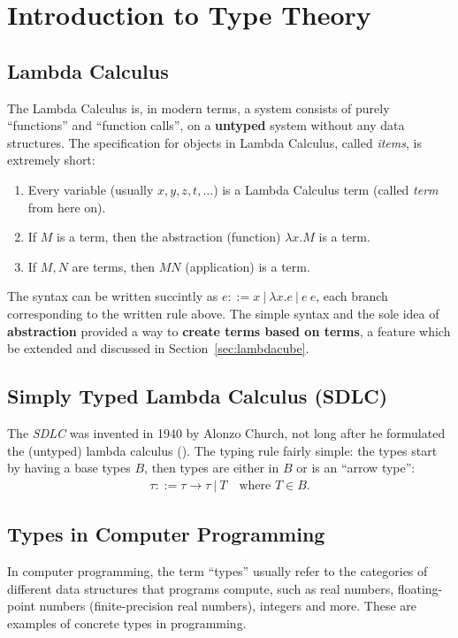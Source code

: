 \documentclass[acmsmall]{acmart}
\begin{document}
\section{Introduction to Type Theory}\label{sec:tt}

\subsection{Lambda Calculus}
The Lambda Calculus is, in modern terms, a system consists of purely
``functions'' and ``function calls'', on a \textbf{untyped} system without any data
structures. The specification for objects in Lambda Calculus, called
\emph{items}, is extremely short:
\begin{enumerate}
  \item Every variable (usually $x, y, z, t, \ldots$) is a Lambda Calculus term
        (called \emph{term} from here on).
  \item If $M$ is a term, then the abstraction (function) $\lambda x. M$ is a term.
  \item If $M, N$ are terms, then $M N$ (application) is a term.
\end{enumerate}

The syntax can be written succintly as $e ::= x\ |\ \lambda x.e\ |\ e\ e$, each branch
corresponding to the written rule above. The simple syntax and the sole idea of
\textbf{abstraction} provided a way to \textbf{create terms based on terms}, a
feature which be extended and discussed in Section~\ref{sec:lambdacube}.

\subsection{Simply Typed Lambda Calculus (SDLC)}
The \emph{SDLC} was invented in 1940 by Alonzo Church, not long after he
formulated the (untyped) lambda calculus (\cite{church1940formulation}). The
typing rule fairly simple: the types start by having a base types $B$, then
types are either in $B$ or is an ``arrow type'':
\begin{align*}
  \tau ::=  \tau\to \tau\ |\ T \quad \text{where }T\in B.
\end{align*}

\subsection{Types in Computer Programming}
In computer programming, the term ``types'' usually refer to the categories of
different data structures that programs compute, such as real numbers,
floating-point numbers (finite-precision real numbers), integers and more. These
are examples of concrete types in programming.
\end{document}
